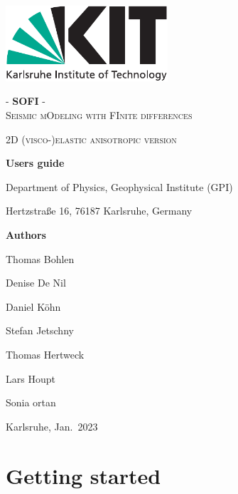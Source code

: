 \documentclass[11pt,english,a4paper]{article}
\begin{document}
\begin{titlepage}
       	\centering
        {\includegraphics[height=2.8cm]{figures/kitlogo_en_cmyk}}
    
	\vspace{2cm}
	
	\textsc{\Huge - \textbf{SOFI} -\\ Seismic mOdeling with FInite differences\\}
	
	\vspace{1cm}
	
	\textsc{\huge 2D (visco-)elastic anisotropic version}
	
	\vspace{1cm}
	
	{\large \textbf{Users guide}\par}
	\vspace{1cm}
 	Department of Physics, Geophysical Institute (GPI)\par
	Hertzstra\ss{}e 16, 76187 Karlsruhe, Germany\par
	\vspace{1.5cm}
	{\large \textbf{Authors}\par} 
	Thomas Bohlen\par
	Denise De Nil \par
	Daniel K\"ohn \par
	Stefan Jetschny \par
    Thomas Hertweck \par 
    Lars Houpt \par 
    Sonia ortan\par
    \vspace{1cm}
    {\large Karlsruhe, Jan.\ 2023\par}
\end{titlepage}

\thispagestyle{empty}
\cleardoublepage

\tableofcontents
\newpage

\section{Getting started}
\end{document}
